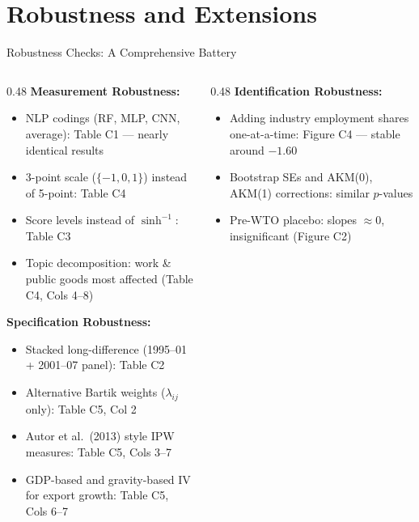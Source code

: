 \documentclass[10pt,aspectratio=169,t]{beamer}
\newcommand{\gmark}[1]{\textcolor{resultgreen}{#1}}
\newcommand{\asinh}{\operatorname{sinh}^{-1}}
\begin{document}
\section{Robustness and Extensions}

\begin{frame}{Robustness Checks: A Comprehensive Battery}

\begin{columns}[T]
\begin{column}{0.48\textwidth}
\textbf{Measurement Robustness:}
\begin{itemize}\setlength{\itemsep}{3pt}
    \item[\gmark{$\checkmark$}] NLP codings (RF, MLP, CNN, average): Table C1 --- nearly identical results
    \item[\gmark{$\checkmark$}] 3-point scale ($\{-1,0,1\}$) instead of 5-point: Table C4
    \item[\gmark{$\checkmark$}] Score levels instead of $\asinh$: Table C3
    \item[\gmark{$\checkmark$}] Topic decomposition: work \& public goods most affected (Table C4, Cols 4--8)
\end{itemize}

\bigskip
\textbf{Specification Robustness:}
\begin{itemize}\setlength{\itemsep}{3pt}
    \item[\gmark{$\checkmark$}] Stacked long-difference (1995--01 + 2001--07 panel): Table C2
    \item[\gmark{$\checkmark$}] Alternative Bartik weights ($\lambda_{ij}$ only): Table C5, Col 2
    \item[\gmark{$\checkmark$}] Autor et al.\ (2013) style IPW measures: Table C5, Cols 3--7
    \item[\gmark{$\checkmark$}] GDP-based and gravity-based IV for export growth: Table C5, Cols 6--7
\end{itemize}
\end{column}
\begin{column}{0.48\textwidth}
\textbf{Identification Robustness:}
\begin{itemize}\setlength{\itemsep}{3pt}
    \item[\gmark{$\checkmark$}] Adding industry employment shares one-at-a-time: Figure C4 --- stable around $-1.60$
    \item[\gmark{$\checkmark$}] Bootstrap SEs and AKM(0), AKM(1) corrections: similar $p$-values
    \item[\gmark{$\checkmark$}] Pre-WTO placebo: slopes $\approx 0$, insignificant (Figure C2)
\end{itemize}


\end{column}
\end{columns}
\end{frame}
\end{document}
